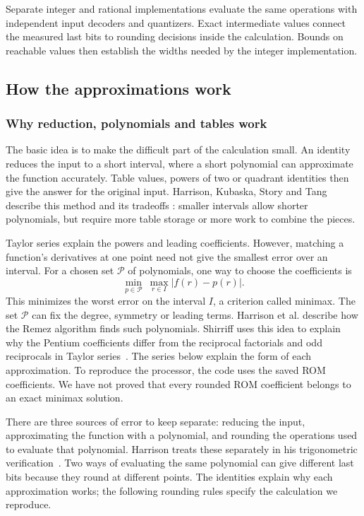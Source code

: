 \documentclass[11pt]{article}
\begin{document}
Separate integer and rational implementations evaluate the same operations
with independent input decoders and quantizers. Exact intermediate values
connect the measured last bits to rounding decisions inside the calculation.
Bounds on reachable values then establish the widths needed by the integer
implementation.

\subsection{How the approximations work}
\label{sec:language}

\subsubsection{Why reduction, polynomials and tables work}

The basic idea is to make the difficult part of the calculation small.
An identity reduces the input to a short interval, where a short polynomial
can approximate the function accurately. Table values, powers of two or
quadrant identities then give the answer for the original input. Harrison,
Kubaska, Story and Tang describe this method and its tradeoffs
\cite[pp.~1--2]{harrison1999}: smaller intervals allow shorter polynomials,
but require more table storage or more work to combine the pieces.

Taylor series explain the powers and leading coefficients. However, matching
a function's derivatives at one point need not give the smallest error over
an interval. For a chosen set $\mathcal P$ of polynomials, one way to choose
the coefficients is
\begin{equation}
 \min_{p\in\mathcal P}\ \max_{r\in I}|f(r)-p(r)|.
\end{equation}
This minimizes the worst error on the interval $I$, a criterion called minimax.
The set $\mathcal P$ can fix the degree, symmetry or leading terms. Harrison
et al. describe how the Remez algorithm finds such polynomials. Shirriff uses
this idea to explain why the Pentium coefficients differ from the reciprocal
factorials and odd reciprocals in Taylor series~\cite{harrison1999,shirriff2025rom}.
The series below explain the form of each approximation. To reproduce the
processor, the code uses the saved ROM coefficients. We have not proved that
every rounded ROM coefficient belongs to an exact minimax solution.

There are three sources of error to keep separate: reducing the input,
approximating the function with a polynomial, and rounding the operations
used to evaluate that polynomial. Harrison treats these separately in his
trigonometric verification~\cite[Sections~4--5]{harrison2000}. Two ways of
evaluating the same polynomial can give different last bits because they
round at different points. The identities explain why each approximation
works; the following rounding rules specify the calculation we reproduce.
\end{document}
